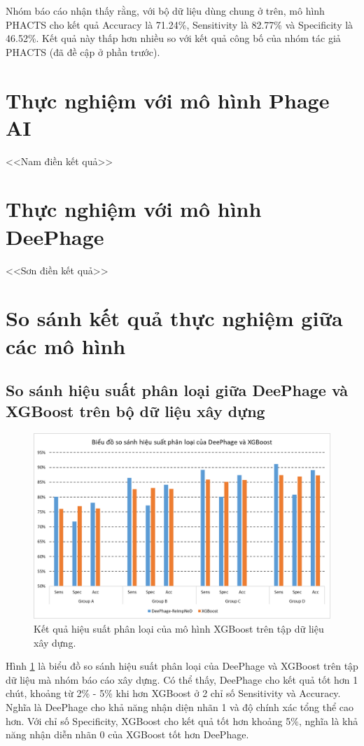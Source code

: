 Nhóm báo cáo nhận thấy rằng, với bộ dữ liệu dùng chung ở trên, mô hình PHACTS cho kết quả Accuracy là 71.24\%, Sensitivity là 82.77\% và Specificity là 46.52\%. Kết quả này thấp hơn nhiều so với kết quả công bố của nhóm tác giả PHACTS (đã đề cập ở phần trước).

\section{Thực nghiệm với mô hình Phage AI}
<<Nam điền kết quả>>

\section{Thực nghiệm với mô hình DeePhage}
<<Sơn điền kết quả>>

\section{So sánh kết quả thực nghiệm giữa các mô hình}


\subsection{So sánh hiệu suất phân loại giữa DeePhage và XGBoost trên bộ dữ liệu xây dựng}

\begin{figure}[H]
    \centering
    \includegraphics[width=1\linewidth]{figures/result_deephage_vs_xgboost.png}
    \caption{Kết quả hiệu suất phân loại của mô hình XGBoost trên tập dữ liệu xây dựng.}
    \label{fig:result_2}
\end{figure}

Hình \ref{fig:result_2} là biểu đồ so sánh hiệu suất phân loại của DeePhage và XGBoost trên tập dữ liệu mà nhóm báo cáo xây dựng. Có thể thấy, DeePhage cho kết quả tốt hơn 1 chút, khoảng từ 2\% - 5\% khi hơn XGBoost ở 2 chỉ số Sensitivity và Accuracy. Nghĩa là DeePhage cho khả năng nhận diện nhãn 1 và độ chính xác tổng thể cao hơn. Với chỉ số Specificity, XGBoost cho kết quả tốt hơn khoảng 5\%, nghĩa là khả năng nhận diễn nhãn 0 của XGBoost tốt hơn DeePhage.

